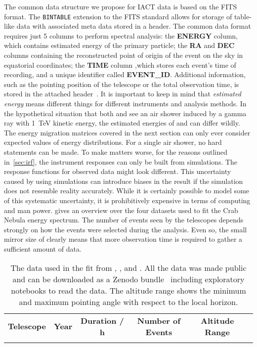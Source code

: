 The common data structure we propose for IACT data is based on the FITS format. The \texttt{BINTABLE} extension
to the FITS standard allows for storage of table-like data with associated meta data stored in a header. The common data format requires 
just 5 columns to perform spectral analysis:
the \textbf{ENERGY} column, which contains estimated energy of the primary particle; the \textbf{RA} and \textbf{DEC} columns containing the 
reconstructed point of origin of the event on the sky in equatorial coordinates; the \textbf{TIME} column
,which stores each event's time of recording, and a unique identifier called \textbf{EVENT\_ID}.
Additional information, such as the pointing position of the telescope or the total observation time, is stored in the attached header~\cite{oga_docs}. 
It is important to keep in mind that \emph{estimated energy} means different things for different instruments and analysis methods. 
In the hypothetical situation that both \fact and \magic see an air shower induced by a gamma ray with \SI{1}{TeV} kinetic energy,
the estimated energies of \fact and \magic can differ wildly. The energy migration matrices covered in the next section can only ever consider expected values
of energy distributions. For a single air shower,  no hard statements can be made. 
To make matters worse, for the reasons outlined in~\ref{sec:irf}, the instrument responses can only be built from simulations. 
The response functions for observed data might look different. This uncertainty caused by using simulations can 
introduce biases in the result if the simulation does not resemble reality accurately.
While it is certainly possible to model some of this systematic uncertainty, it is prohibitively expensive
in terms of computing and man power. 
 gives an overview over the four datasets used to fit the Crab Nebula energy spectrum. 
The number of events seen by the telescopes depends strongly on how the events were selected during the analysis. Even so, the small mirror size of \fact 
clearly means that more observation time is required to gather a sufficient amount of data. 
\begin{table}
  \centering
  \caption[Overview of the open data  from \magic, \hess, \veritas and \fact.]{The data used in the fit from \magic, \hess, \veritas and \fact. 
  All the data was made public and can be downloaded as a Zenodo bundle~\cite{joint_crab} including exploratory \python notebooks to read the data. 
  The altitude range shows the minimum and maximum pointing angle with respect to the local horizon.
  }
  \label{tab:data_overview}
  \begin{tabular}{l  c  S[table-format=1.6]c  c  c}
  \textbf{Telescope} & \textbf{Year} & \textbf{Duration / \si{\hour}}  & \textbf{Number of Events} & \textbf{Altitude Range}  \\
  \addlinespace[0.5em]
    
  \end{tabular}
\end{table}



